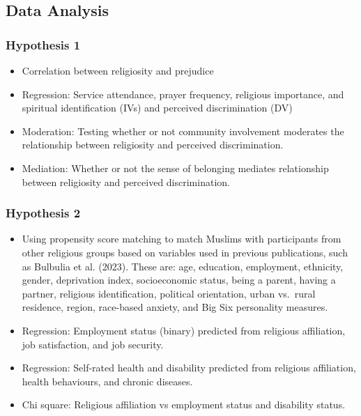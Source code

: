 \documentclass[
]{interact}
\providecommand{\tightlist}{%
  \setlength{\itemsep}{0pt}\setlength{\parskip}{0pt}}\usepackage{longtable,booktabs,array}
\begin{document}
\subsection{Data Analysis}\label{data-analysis}

\subsubsection{Hypothesis 1}\label{hypothesis-1}

\begin{itemize}
\tightlist
\item
  Correlation between religiosity and prejudice
\item
  Regression: Service attendance, prayer frequency, religious
  importance, and spiritual identification (IVs) and perceived
  discrimination (DV)
\item
  Moderation: Testing whether or not community involvement moderates the
  relationship between religiosity and perceived discrimination.
\item
  Mediation: Whether or not the sense of belonging mediates relationship
  between religiosity and perceived discrimination.
\end{itemize}

\subsubsection{Hypothesis 2}\label{hypothesis-2}

\begin{itemize}
\tightlist
\item
  Using propensity score matching to match Muslims with participants
  from other religious groups based on variables used in previous
  publications, such as Bulbulia et al. (2023). These are: age,
  education, employment, ethnicity, gender, deprivation index,
  socioeconomic status, being a parent, having a partner, religious
  identification, political orientation, urban vs.~rural residence,
  region, race-based anxiety, and Big Six personality measures.
\item
  Regression: Employment status (binary) predicted from religious
  affiliation, job satisfaction, and job security.
\item
  Regression: Self-rated health and disability predicted from religious
  affiliation, health behaviours, and chronic diseases.
\item
  Chi square: Religious affiliation vs employment status and disability
  status.
\end{itemize}
\end{document}
